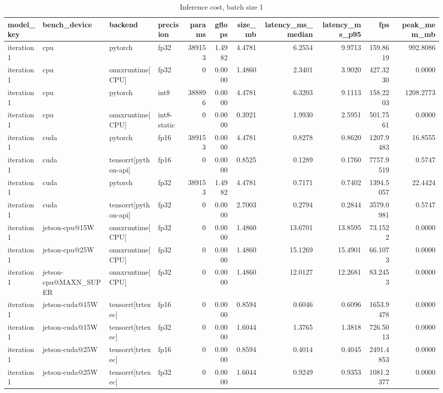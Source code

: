 \begin{table}
\caption{Inference cost, batch size 1}
\begin{tabular}{llllrrrrrrr}
\toprule
model\_key & bench\_device & backend & precision & params & gflops & size\_mb & latency\_ms\_median & latency\_ms\_p95 & fps & peak\_mem\_mb \\
\midrule
iteration1 & cpu & pytorch & fp32 & 389153 & 1.4982 & 4.4781 & 6.2554 & 9.9713 & 159.8619 & 992.8086 \\
iteration1 & cpu & onnxruntime[CPU] & fp32 & 0 & 0.0000 & 1.4860 & 2.3401 & 3.9020 & 427.3230 & 0.0000 \\
iteration1 & cpu & pytorch & int8 & 388896 & 0.0000 & 4.4781 & 6.3203 & 9.1113 & 158.2203 & 1208.2773 \\
iteration1 & cpu & onnxruntime[CPU] & int8-static & 0 & 0.0000 & 0.3921 & 1.9930 & 2.5951 & 501.7561 & 0.0000 \\
iteration1 & cuda & pytorch & fp16 & 389153 & 0.0000 & 4.4781 & 0.8278 & 0.8620 & 1207.9483 & 16.8555 \\
iteration1 & cuda & tensorrt[python-api] & fp16 & 0 & 0.0000 & 0.8525 & 0.1289 & 0.1760 & 7757.9519 & 0.5747 \\
iteration1 & cuda & pytorch & fp32 & 389153 & 1.4982 & 4.4781 & 0.7171 & 0.7402 & 1394.5057 & 22.4424 \\
iteration1 & cuda & tensorrt[python-api] & fp32 & 0 & 0.0000 & 2.7003 & 0.2794 & 0.2844 & 3579.0981 & 0.5747 \\
iteration1 & jetson-cpu@15W & onnxruntime[CPU] & fp32 & 0 & 0.0000 & 1.4860 & 13.6701 & 13.8595 & 73.1522 & 0.0000 \\
iteration1 & jetson-cpu@25W & onnxruntime[CPU] & fp32 & 0 & 0.0000 & 1.4860 & 15.1269 & 15.4901 & 66.1073 & 0.0000 \\
iteration1 & jetson-cpu@MAXN\_SUPER & onnxruntime[CPU] & fp32 & 0 & 0.0000 & 1.4860 & 12.0127 & 12.2681 & 83.2453 & 0.0000 \\
iteration1 & jetson-cuda@15W & tensorrt[trtexec] & fp16 & 0 & 0.0000 & 0.8594 & 0.6046 & 0.6096 & 1653.9478 & 0.0000 \\
iteration1 & jetson-cuda@15W & tensorrt[trtexec] & fp32 & 0 & 0.0000 & 1.6044 & 1.3765 & 1.3818 & 726.5013 & 0.0000 \\
iteration1 & jetson-cuda@25W & tensorrt[trtexec] & fp16 & 0 & 0.0000 & 0.8594 & 0.4014 & 0.4045 & 2491.4853 & 0.0000 \\
iteration1 & jetson-cuda@25W & tensorrt[trtexec] & fp32 & 0 & 0.0000 & 1.6044 & 0.9249 & 0.9353 & 1081.2377 & 0.0000 \\

\end{tabular}
\end{table}
